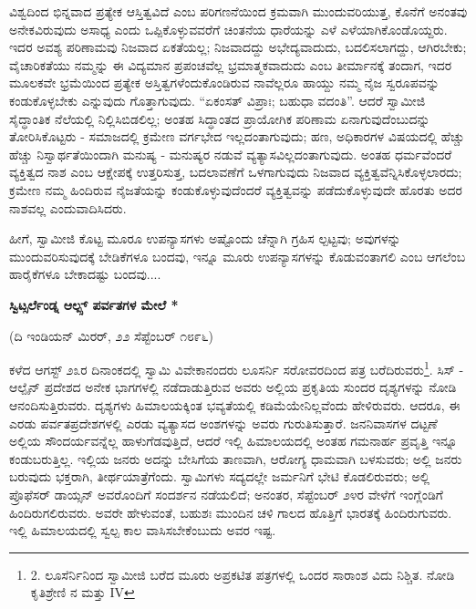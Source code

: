 ವಿಶ್ವದಿಂದ ಭಿನ್ನವಾದ ಪ್ರತ್ಯೇಕ ಆಸ್ತಿತ್ವವಿದೆ ಎಂಬ ಪರಿಗಣನೆಯಿಂದ ಕ್ರಮವಾಗಿ ಮುಂದುವರಿಯುತ್ತ, ಕೊನೆಗೆ ಅನಂತವು ಅನೇಕವಿರುವುದು ಅಸಾಧ್ಯ ಎಂದು ಒಪ್ಪಿಕೊಳ್ಳುವವರೆಗೆ ಚಿಂತನೆಯ ಧಾರೆಯನ್ನು ಎಳೆ ಎಳೆಯಾಗಿಕೊಂಡೊಯ್ದರು. ಇದರ ಅವಶ್ಯ ಪರಿಣಾಮವು ನಿಜವಾದ ಏಕತೆಯಲ್ಲ; ನಿಜವಾದದ್ದು ಅಭೇದ್ಯವಾದುದು, ಬದಲಿಸಲಾಗದ್ದು, ಆಗಿರಬೇಕು; ವೈಚಾರಿಕತೆಯು ನಮ್ಮನ್ನು ಈ ವಿದ್ಯಮಾನ ಪ್ರಪಂಚವೆಲ್ಲ ಭ್ರಮಾತ್ಮಕವಾದುದು ಎಂಬ ತೀರ್ಮಾನಕ್ಕೆ ತಂದಾಗ, ಇದರ ಮೂಲಕವೇ ಭ್ರಮೆಯಿಂದ ಪ್ರತ್ಯೇಕ ಅಸ್ತಿತ್ವಗಳೆಂದುಕೊಂಡಿರುವ ನಾವೆಲ್ಲರೂ ಹಾಯ್ದು ನಮ್ಮ ನೈಜ ಸ್ವರೂಪವನ್ನು ಕಂಡುಕೊಳ್ಳಬೇಕು ಎನ್ನುವುದು ಗೊತ್ತಾಗುವುದು. “ಏಕಂಸತ್ ವಿಪ್ರಾಃ; ಬಹುಧಾ ವದಂತಿ”. ಆದರೆ ಸ್ವಾಮೀಜಿ ಸೈದ್ಧಾಂತಿಕ ನೆಲೆಯಲ್ಲಿ ನಿಲ್ಲಿಸಿಬಿಡಲಿಲ್ಲ; ಅಂತಹ ಸಿದ್ಧಾಂತದ ಪ್ರಾಯೋಗಿಕ ಪರಿಣಾಮ ಏನಾಗುವುದೆಂಬುದನ್ನು ತೋರಿಸಿಕೊಟ್ಟರು - ಸಮಾಜದಲ್ಲಿ ಕ್ರಮೇಣ ವರ್ಗಭೇದ ಇಲ್ಲದಂತಾಗುವುದು; ಹಣ, ಅಧಿಕಾರಗಳ ವಿಷಯದಲ್ಲಿ ಹೆಚ್ಚು ಹೆಚ್ಚು ನಿಸ್ವಾರ್ಥತೆಯಿಂದಾಗಿ ಮನುಷ್ಯ - ಮನುಷ್ಯರ ನಡುವೆ ವ್ಯತ್ಯಾಸವಿಲ್ಲದಂತಾಗುವುದು. ಅಂತಹ ಧರ್ಮವೆಂದರೆ ವ್ಯಕ್ತಿತ್ವದ ನಾಶ ಎಂಬ ಆಕ್ಷೇಪಕ್ಕೆ ಉತ್ತರಿಸುತ್ತ, ಬದಲಾವಣೆಗೆ ಒಳಗಾಗುವುದು ನಿಜವಾದ ವ್ಯಕ್ತಿತ್ವವೆನ್ನಿಸಿಕೊಳ್ಳಲಾರದು; ಕ್ರಮೇಣ ನಮ್ಮ ಹಿಂದಿರುವ ನೈಜತೆಯನ್ನು ಕಂಡುಕೊಳ್ಳುವುದೆಂದರೆ ವ್ಯಕ್ತಿತ್ವವನ್ನು ಪಡೆದುಕೊಳ್ಳುವುದೇ ಹೊರತು ಅದರ ನಾಶವಲ್ಲ ಎಂದುವಾದಿಸಿದರು.

ಹೀಗೆ, ಸ್ವಾಮೀಜಿ ಕೊಟ್ಟ ಮೂರೂ ಉಪನ್ಯಾಸಗಳು ಅಷ್ಟೊಂದು ಚೆನ್ನಾಗಿ ಗ್ರಹಿಸ ಲ್ಪಟ್ಟವು; ಅವುಗಳನ್ನು ಮುಂದುವರಿಸುವುದಕ್ಕೆ ಬೇಡಿಕೆಗಳೂ ಬಂದವು, ಇನ್ನೂ ಮೂರು ಉಪನ್ಯಾಸಗಳನ್ನು ಕೊಡುವಂತಾಗಲಿ ಎಂಬ ಆಗಲೆಂಬ ಹಾರೈಕೆಗಳೂ ಬೇಕಾದಷ್ಟು ಬಂದವು....

\textbf{ಸ್ವಿಟ್ಸರ್ಲೆಂಡ್ನ ಆಲ್ಪ್ಸ್ ಪರ್ವತಗಳ ಮೇಲೆ *}

\begin{center}
(ದಿ ಇಂಡಿಯನ್ ಮಿರರ್, ೨೨ ಸೆಪ್ಟೆಂಬರ್ ೧೮೯೬)
\end{center}

ಕಳೆದ ಆಗಸ್ಟ್ ೨೩ರ ದಿನಾಂಕದಲ್ಲಿ ಸ್ವಾಮಿ ವಿವೇಕಾನಂದರು ಲೂಸರ್ನಿ ಸರೋವರದಿಂದ ಪತ್ರ ಬರೆದಿರುವರು\footnote{2. ಲೂಸೆರ್ನಿನಿಂದ ಸ್ವಾಮೀಜಿ ಬರೆದ ಮೂರು ಅಪ್ರಕಟಿತ ಪತ್ರಗಳಲ್ಲಿ ಒಂದರ ಸಾರಾಂಶ ವಿದು ನಿಶ್ಚಿತ. ನೋಡಿ  ಕೃತಿಶ್ರೇಣಿ  ನ ಮತ್ತು \enginline{} IV}. ಸಿಸ್ - ಆಲ್ಪೈನ್ ಪ್ರದೇಶದ ಅನೇಕ ಭಾಗಗಳಲ್ಲಿ ನಡೆದಾಡುತ್ತಿರುವ ಅವರು ಅಲ್ಲಿಯ ಪ್ರಕೃತಿಯ ಸುಂದರ ದೃಶ್ಯಗಳನ್ನು ನೋಡಿ ಆನಂದಿಸುತ್ತಿರುವರು. ದೃಶ್ಯಗಳು ಹಿಮಾಲಯಕ್ಕಿಂತ ಭವ್ಯತೆಯಲ್ಲಿ ಕಡಿಮೆಯೇನಿಲ್ಲವೆಂದು ಹೇಳಿರುವರು. ಆದರೂ, ಈ ಎರಡು ಪರ್ವತಪ್ರದೇಶಗಳಲ್ಲಿ ಎರಡು ವ್ಯತ್ಯಾಸದ ಅಂಶಗಳನ್ನು ಅವರು ಗುರುತಿಸುತ್ತಾರೆ. ಜನನಿವಾಸಗಳ ದಟ್ಟಣೆ ಅಲ್ಲಿಯ ಸೌಂದರ್ಯವನ್ನೆಲ್ಲ ಹಾಳುಗೆಡವುತ್ತಿದೆ, ಆದರೆ ಇಲ್ಲಿ ಹಿಮಾಲಯದಲ್ಲಿ ಅಂತಹ ಗಮನಾರ್ಹ ಪ್ರವೃತ್ತಿ ಇನ್ನೂ ಕಂಡುಬರುತ್ತಿಲ್ಲ. ಇಲ್ಲಿಯ ಜನರು ಅದನ್ನು ಬೇಸಿಗೆಯ ತಾಣವಾಗಿ, ಆರೋಗ್ಯ ಧಾಮವಾಗಿ ಬಳಸುವರು; ಅಲ್ಲಿ ಜನರು ಬರುವುದು ಭಕ್ತರಾಗಿ, ತೀರ್ಥಯಾತ್ರೆಗೆಂದು. ಸ್ವಾಮಿಗಳು ಸದ್ಯದಲ್ಲೇ ಜರ್ಮನಿಗೆ ಭೇಟಿ ಕೊಡಲಿರುವರು; ಅಲ್ಲಿ ಪ್ರೊಫೆಸರ್ ಡಾಯ್ಸನ್ ಅವರೊಂದಿಗೆ ಸಂದರ್ಶನ ನಡೆಯಲಿದೆ; ಅನಂತರ, ಸೆಪ್ಟೆಂಬರ್ ೨೪ರ ವೇಳೆಗೆ ಇಂಗ್ಲೆಂಡಿಗೆ ಹಿಂದಿರುಗಲಿರುವರು. ಅವರೇ ಹೇಳುವಂತೆ, ಬಹುಶಃ ಮುಂದಿನ ಚಳಿ ಗಾಲದ ಹೊತ್ತಿಗೆ ಭಾರತಕ್ಕೆ ಹಿಂದಿರುಗುವರು. ಇಲ್ಲಿ ಹಿಮಾಲಯದಲ್ಲಿ ಸ್ವಲ್ಪ ಕಾಲ ವಾಸಿಸಬೇಕೆಂಬುದು ಅವರ ಇಷ್ಟ.

